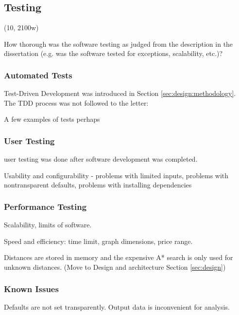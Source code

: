 \subsection{Testing}
\label{sec:implementation:testing}

(10, 2100w)

How thorough was the software testing as judged from the description in the
dissertation (e.g. was the software tested for exceptions, scalability, etc.)?


\subsubsection{Automated Tests}

Test-Driven Development was introduced in Section \ref{sec:design:methodology}.
The TDD process was not followed to the letter: 

A few examples of tests perhaps


\subsubsection{User Testing}

user testing was done after software development
was completed. 

Usability and configurability - problems with limited inputs, problems with
nontransparent defaults, problems with installing dependencies


\subsubsection{Performance Testing}

Scalability, limits of software. 

Speed and efficiency: time limit, graph dimensions, price range. 

Distances are stored in memory and the expensive A* search is only used for
unknown distances. (Move to Design and architecture Section \ref{sec:design})


\subsubsection{Known Issues}

Defaults are not set transparently. Output data is inconvenient for analysis. 
